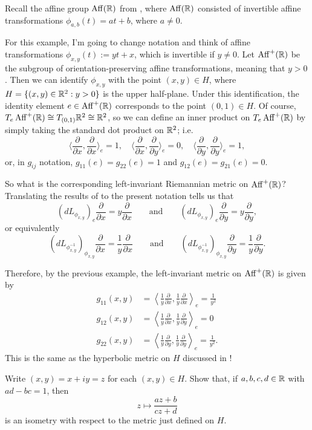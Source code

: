 \begin{example}
	Recall the affine group $\operatorname{Aff}(\mathbb{R})$ from , where $\operatorname{Aff}(\mathbb{R})$ consisted of invertible affine transformations $\phi_{a,b}(t) = at + b$, where $a \neq 0$. 
	
	For this example, I'm going to change notation and think of affine transformations $\phi_{x,y}(t) := yt + x$, which is invertible if $y \neq 0$. Let $\operatorname{Aff}^+(\mathbb{R})$ be the subgroup of orientation-preserving affine transformations, meaning that $y > 0$. Then we can identify $\phi_{x,y}$ with the point $(x,y) \in H$, where $H = \{(x,y) \in \mathbb{R}^2 : y > 0\}$ is the upper half-plane. Under this identification, the identity element $e \in \operatorname{Aff}^+(\mathbb{R})$ corresponds to the point $(0,1) \in H$. Of course, $T_e \operatorname{Aff}^+(\mathbb{R}) \cong T_{(0,1)} \mathbb{R}^2 \cong \mathbb{R}^2$, so we can define an inner product on $T_e \operatorname{Aff}^+(\mathbb{R})$ by simply taking the standard dot product on $\mathbb{R}^2$; i.e.
	\[
		\langle \frac{\partial}{\partial x}, \frac{\partial}{\partial x} \rangle_e = 1, \quad \langle \frac{\partial}{\partial x}, \frac{\partial}{\partial y} \rangle_e = 0, \quad \langle \frac{\partial}{\partial y}, \frac{\partial}{\partial y} \rangle_e = 1,
	\]
	or, in $g_{ij}$ notation, $g_{11}(e) = g_{22}(e) = 1$ and $g_{12}(e) = g_{21}(e) = 0$.
	
	So what is the corresponding left-invariant Riemannian metric on $\operatorname{Aff}^+(\mathbb{R})$? Translating the results of  to the present notation tells us that
	\[
		(dL_{\phi_{x,y}})_e \frac{\partial}{\partial x} = y \frac{\partial}{\partial x} \qquad \text{and} \qquad (dL_{\phi_{x,y}})_e \frac{\partial}{\partial y} = y \frac{\partial}{\partial y},
	\]
	or equivalently
	\[
		(dL_{\phi_{x,y}^{-1}})_{\phi_{x,y}} \frac{\partial}{\partial x} = \frac{1}{y} \frac{\partial}{\partial x} \qquad \text{and} \qquad (dL_{\phi_{x,y}^{-1}})_{\phi_{x,y}} \frac{\partial}{\partial y} = \frac{1}{y} \frac{\partial}{\partial y}.
	\]
	
	Therefore, by the previous example, the left-invariant metric on $\operatorname{Aff}^+(\mathbb{R})$ is given by
	\begin{align*}
		g_{11}(x,y) & = \left\langle \frac{1}{y} \frac{\partial}{\partial x}, \frac{1}{y} \frac{\partial}{\partial x} \right\rangle_e = \frac{1}{y^2} \\
		g_{12}(x,y) & = \left\langle \frac{1}{y} \frac{\partial}{\partial x}, \frac{1}{y} \frac{\partial}{\partial y} \right\rangle_e = 0 \\
		g_{22}(x,y) & = \left\langle \frac{1}{y} \frac{\partial}{\partial y}, \frac{1}{y} \frac{\partial}{\partial y} \right\rangle_e = \frac{1}{y^2}.
	\end{align*}
	This is the same as the hyperbolic metric on $H$ discussed in !
	
	\begin{exercise}
		Write $(x,y) = x+iy = z$ for each $(x,y) \in H$. Show that, if $a,b,c,d \in \mathbb{R}$ with $ad-bc = 1$, then
		\[
			z \mapsto \frac{az+b}{cz+d}
		\]
		is an isometry with respect to the metric just defined on $H$.
	\end{exercise}
\end{example}

